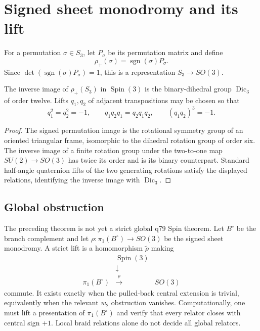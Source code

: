 \documentclass[11pt]{article}
\begin{document}
\section{Signed sheet monodromy and its lift}

For a permutation $\sigma\in S_3$, let $P_\sigma$ be its permutation matrix
and define
\[
 \rho_+(\sigma)=\operatorname{sgn}(\sigma)P_\sigma.
\]
Since
$\det(\operatorname{sgn}(\sigma)P_\sigma)=1$, this is a representation
$S_3\to SO(3)$.

\begin{theorem}
The inverse image of $\rho_+(S_3)$ in $\operatorname{Spin}(3)$ is the
binary-dihedral group $\operatorname{Dic}_3$ of order twelve.  Lifts $q_1,q_2$
of adjacent transpositions may be chosen so that
\[
 q_1^2=q_2^2=-1,
 \qquad q_1q_2q_1=q_2q_1q_2,
 \qquad (q_1q_2)^3=-1.
\]
\end{theorem}

\begin{proof}
The signed permutation image is the rotational symmetry group of an oriented
triangular frame, isomorphic to the dihedral rotation group of order six.  The
inverse image of a finite rotation group under the two-to-one map
$SU(2)\to SO(3)$ has twice its order and is its binary counterpart.  Standard
half-angle quaternion lifts of the two generating rotations satisfy the
displayed relations, identifying the inverse image with
$\operatorname{Dic}_3$.
\end{proof}

\subsection{Global obstruction}

The preceding theorem is not yet a strict global q79 Spin theorem.  Let
$B^\circ$ be the branch complement and let
$\rho:\pi_1(B^\circ)\to SO(3)$ be the signed sheet monodromy.  A strict lift is
a homomorphism $\widetilde\rho$ making
\[
\begin{array}{ccc}
 &\operatorname{Spin}(3)&\\[-2mm]
 &\downarrow&\\[-1mm]
 \pi_1(B^\circ)&\xrightarrow{\rho}&SO(3)
\end{array}
\]
commute.  It exists exactly when the pulled-back central extension is trivial,
equivalently when the relevant $w_2$ obstruction vanishes.  Computationally,
one must lift a presentation of $\pi_1(B^\circ)$ and verify that every relator
closes with central sign $+1$.  Local braid relations alone do not decide all
global relators.
\end{document}
